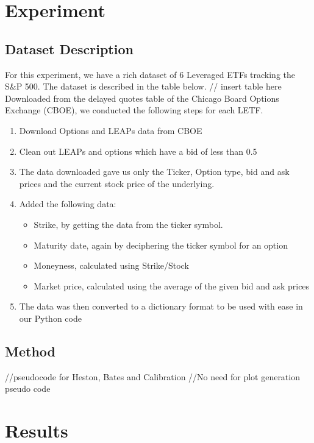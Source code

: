 \documentclass{article}
\begin{document}
\section{Experiment}
\subsection{Dataset Description}
For this experiment, we have a rich dataset of 6 Leveraged ETFs tracking the S&P 500. The dataset is described in the table below. 
\newline\newline
 // insert table here
\newline\newline
Downloaded from the delayed quotes table of the Chicago Board Options Exchange (CBOE), we conducted the following steps for each LETF. 

\begin{enumerate}
    \item Download Options and LEAPs data from CBOE
    \item Clean out LEAPs and options which have a bid of less than 0.5
    \item The data downloaded gave us only the Ticker, Option type, bid and ask prices and the current stock price of the underlying. 
    \item Added the following data:
    \begin{itemize}
         \item Strike, by getting the data from the ticker symbol.
         \item Maturity date, again by deciphering the ticker symbol for an option
         \item Moneyness, calculated using Strike/Stock
         \item Market price, calculated using the average of the given bid and ask prices
    \end{itemize}
    \item The data was then converted to a dictionary format to be used with ease in our Python code
\end{enumerate}

\subsection{Method}

//pseudocode for Heston, Bates and Calibration
//No need for plot generation pseudo code

\section{Results}
\end{document}

